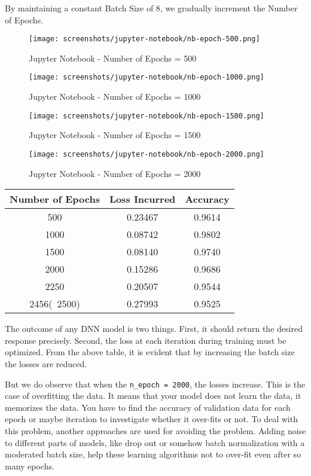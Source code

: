 By maintaining a constant Batch Size of 8, we gradually increment the Number of Epochs.

\begin{figure}[H]
    \centering
    \texttt{[image: screenshots/jupyter-notebook/nb-epoch-500.png]}
    \caption{Jupyter Notebook - Number of Epochs = 500}
\end{figure}

\begin{figure}[H]
    \centering
    \texttt{[image: screenshots/jupyter-notebook/nb-epoch-1000.png]}
    \caption{Jupyter Notebook - Number of Epochs = 1000}
\end{figure}

\begin{figure}[H]
    \centering
    \texttt{[image: screenshots/jupyter-notebook/nb-epoch-1500.png]}
    \caption{Jupyter Notebook - Number of Epochs = 1500}
\end{figure}

\begin{figure}[H]
    \centering
    \texttt{[image: screenshots/jupyter-notebook/nb-epoch-2000.png]}
    \caption{Jupyter Notebook - Number of Epochs = 2000}
\end{figure}

\begin{center}
    \begin{tabular}{ |c|c|c| } 
        \hline
        Number of Epochs & Loss Incurred & Accuracy \\ [0.5ex]
        \hline\hline
        500 & 0.23467 & 0.9614 \\
        1000 & 0.08742 & 0.9802 \\
        1500 & 0.08140 & 0.9740 \\
        2000 & 0.15286 & 0.9686 \\
        2250 & 0.20507 & 0.9544 \\
        2456(~2500) & 0.27993 & 0.9525 \\
        \hline
    \end{tabular}
\end{center}

The outcome of any DNN model is two things. First, it should return the desired response precisely. Second, the loss at each iteration during training must be optimized. From the above table, it is evident that by increasing the batch size the losses are reduced.

But we do observe that when the \texttt{n\_epoch = 2000}, the losses increase. This is the case of overfitting the data. It means that your model does not learn the data, it memorizes the data. You have to find the accuracy of validation data for each epoch or maybe iteration to investigate whether it over-fits or not. To deal with this problem, another approaches are used for avoiding the problem. Adding noise to different parts of models, like drop out or somehow batch normalization with a moderated batch size, help these learning algorithms not to over-fit even after so many epochs.

